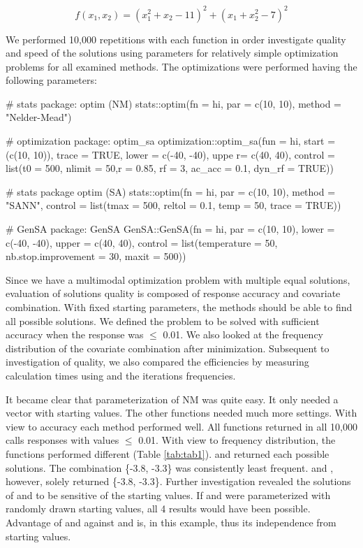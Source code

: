 \begin{equation}
\label{eq:eq2}
f(x_1,x_2)=(x_1^2+x_2-11)^2+(x_1+x_2^2-7)^2
\end{equation}

We performed 10,000 repetitions with each function in order investigate quality and speed of the solutions using parameters for relatively simple optimization problems for all examined methods. The optimizations were performed having the following parameters:
    
    \begin{example}
# stats package: optim (NM)
stats::optim(fn = hi, par = c(10, 10), method = "Nelder-Mead")

# optimization package: optim_sa
optimization::optim_sa(fun = hi, start = (c(10, 10)), trace = TRUE, 
                       lower = c(-40, -40), uppe r= c(40, 40),
                       control = list(t0 = 500, nlimit = 50,r = 0.85,
                                      rf = 3, ac_acc = 0.1, dyn_rf = TRUE))

# stats package optim (SA)
stats::optim(fn = hi, par = c(10, 10), method = "SANN",
             control = list(tmax = 500, reltol = 0.1, temp = 50, trace = TRUE))

# GenSA package: GenSA
GenSA::GenSA(fn = hi, par = c(10, 10), lower = c(-40, -40), upper = c(40, 40), 
             control = list(temperature = 50, nb.stop.improvement = 30, maxit = 500))
\end{example}
Since we have a multimodal optimization problem with multiple equal solutions, evaluation of solutions quality is composed of response accuracy and covariate combination. With fixed starting parameters, the methods should be able to find all possible solutions. We defined the problem to be solved with sufficient accuracy when the response was $\leq$ 0.01. We also looked at the frequency distribution of the covariate combination after minimization. Subsequent to investigation of quality, we also compared the efficiencies by measuring calculation times using  and the iterations frequencies.

It became clear that parameterization of NM was quite easy. It only needed a vector with starting values. The other functions needed much more settings. With view to accuracy each method performed well. All functions returned in all 10,000 calls responses with values $\leq$ 0.01. With view to frequency distribution, the functions performed different (Table \ref{tab:tab1}).  and  returned each possible solutions.  The combination \{-3.8, -3.3\} was consistently least frequent.  and , however, solely returned \{-3.8, -3.3\}. Further investigation revealed the solutions of  and  to be sensitive of the starting values. If  and  were parameterized with randomly drawn starting values, all 4 results would have been possible. Advantage of  and  against  and  is, in this example, thus its independence from starting values.

